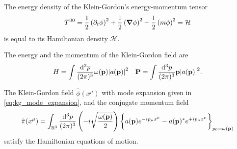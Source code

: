 \begin{lemma}\label{thm:kg_energy_density}
	The energy density of the Klein-Gordon's energy-momentum tensor
	\begin{equation}
		T^{00}
		=
		\frac{1}{2}
		\left(\partial_t\phi\right)^2
		+
		\frac{1}{2}
		\left(\grad\phi\right)^2
		+
		\frac{1}{2}
		\left(m\phi\right)^2
		=
		\mathcal{H}
		\label{thm:kg_hamiltonian}
	\end{equation}
	is equal to its Hamiltonian density $\mathcal{H}$.
\end{lemma}
\begin{lemma}\label{thm:kg_energy_momentum}
	The energy and the momentum of the Klein-Gordon field are
	\begin{align}
		H
		=
		\int\frac{\dd[3]{p}}{(2\pi)^3}
		\omega(\vb{p})\abs{a(\vb{p})}^2
		&&
		\vb{P}
		=
		\int\frac{\dd[3]{p}}{(2\pi)^3}
		\vb{p}\abs{a(\vb{p})}^2
		\label{eq:kg_energy_momentum}
		.
	\end{align}
\end{lemma}
\begin{lemma}\label{thm:kg_conjugate_momentum}
	The Klein-Gordon field $\hat\phi(x^\mu)$ with mode expansion given in \cref{eq:kg_mode_expansion}, and the conjugate momentum field
	\begin{equation}
		\hat\pi(x^\mu)
		=
		\int_{\mathbb{R}^3}\frac{\dd[3]{p}}{(2\pi)^3}
		\left(
			-i
			\sqrt{\frac{\omega(\vb{p})}{2}}
		\right)
		\biggl\{
			a(\vb{p})
			e^{-ip_\mu x^\mu}
			-
			a(\vb{p})^*
			e^{+ip_\mu x^\mu}
		\biggr\}_{p_0=\omega(\vb{p})}
		\label{eq:kg_conjugate_momentum}
	\end{equation}
	satisfy the Hamiltonian equations of motion.
\end{lemma}